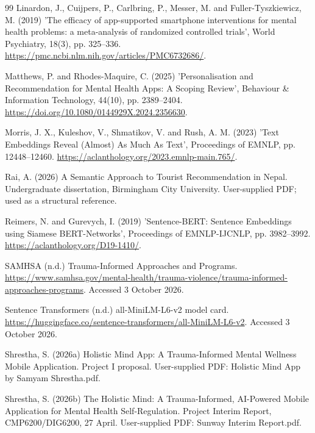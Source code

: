\begin{thebibliography}{99}
Linardon, J., Cuijpers, P., Carlbring, P., Messer, M. and Fuller-Tyszkiewicz, M. (2019) 'The efficacy of app-supported smartphone interventions for mental health problems: a meta-analysis of randomized controlled trials', World Psychiatry, 18(3), pp. 325--336. \url{https://pmc.ncbi.nlm.nih.gov/articles/PMC6732686/}.

Matthews, P. and Rhodes-Maquire, C. (2025) 'Personalisation and Recommendation for Mental Health Apps: A Scoping Review', Behaviour \& Information Technology, 44(10), pp. 2389--2404. \url{https://doi.org/10.1080/0144929X.2024.2356630}.

Morris, J. X., Kuleshov, V., Shmatikov, V. and Rush, A. M. (2023) 'Text Embeddings Reveal (Almost) As Much As Text', Proceedings of EMNLP, pp. 12448--12460. \url{https://aclanthology.org/2023.emnlp-main.765/}.

Rai, A. (2026) A Semantic Approach to Tourist Recommendation in Nepal. Undergraduate dissertation, Birmingham City University. User-supplied PDF; used as a structural reference.

Reimers, N. and Gurevych, I. (2019) 'Sentence-BERT: Sentence Embeddings using Siamese BERT-Networks', Proceedings of EMNLP-IJCNLP, pp. 3982--3992. \url{https://aclanthology.org/D19-1410/}.

SAMHSA (n.d.) Trauma-Informed Approaches and Programs. \url{https://www.samhsa.gov/mental-health/trauma-violence/trauma-informed-approaches-programs}. Accessed 3 October 2026.

Sentence Transformers (n.d.) all-MiniLM-L6-v2 model card. \url{https://huggingface.co/sentence-transformers/all-MiniLM-L6-v2}. Accessed 3 October 2026.

Shrestha, S. (2026a) Holistic Mind App: A Trauma-Informed Mental Wellness Mobile Application. Project I proposal. User-supplied PDF: Holistic Mind App by Samyam Shrestha.pdf.

Shrestha, S. (2026b) The Holistic Mind: A Trauma-Informed, AI-Powered Mobile Application for Mental Health Self-Regulation. Project Interim Report, CMP6200/\allowbreak{}DIG6200, 27 April. User-supplied PDF: Sunway Interim Report.pdf.


\end{thebibliography}
